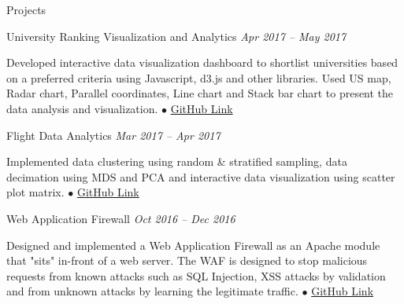 \documentclass{resume} %
\begin{document}
\begin{rSection}{Projects}


\begin{rSubsection}{University Ranking Visualization and Analytics}
{\emph {Apr 2017 -- May 2017}}{}{}
    \item Developed interactive data visualization dashboard to shortlist universities based on a preferred criteria using Javascript, d3.js and other libraries. Used US map, Radar chart, Parallel coordinates, Line chart and Stack bar chart to present the data analysis and visualization.
    {\tiny$\bullet$}
    \href{https://github.com/sudeshnapal12/University-Ranking-Analytics-and-Visualization}{GitHub Link}
\end{rSubsection}


\begin{rSubsection}{Flight Data Analytics}
{\emph {Mar 2017 -- Apr 2017}}{}{}
    \item Implemented data clustering using random \& stratified sampling, data decimation using MDS and PCA and interactive data visualization using scatter plot matrix.
    {\tiny$\bullet$}
    \href{https://github.com/sudeshnapal12/Flight-data-Analytics}{GitHub Link}
\end{rSubsection}


\newpage

\begin{rSubsection}{Web Application Firewall} {\emph {Oct 2016 -- Dec 2016}}{}{}
	\item Designed and implemented a Web Application Firewall as an Apache module that "sits" in-front of a web server. The WAF is designed to stop malicious requests from known attacks such as SQL Injection, XSS attacks by validation and from unknown attacks by learning the legitimate traffic.
	{\tiny$\bullet$}
    \href{https://github.com/sudeshnapal12/Web-Application-Firewall}{GitHub Link}
\end{rSubsection}



\end{rSection}
\end{document}
